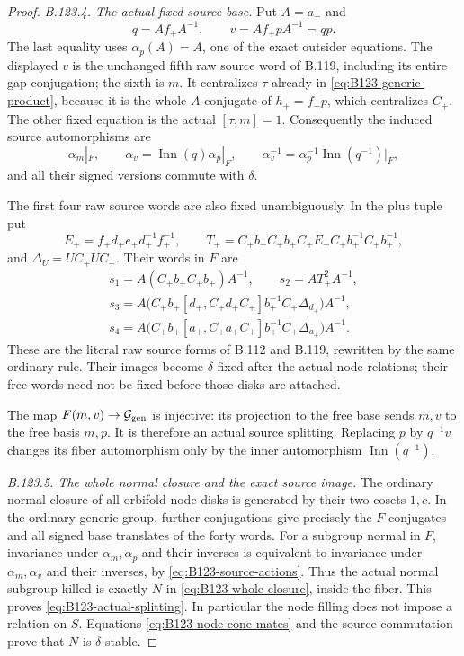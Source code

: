 \begin{proof}
\emph{B.123.4. The actual fixed source base.}
Put $A=a_+$ and
\begin{equation}\label{eq:B123-source-base}
 q=Af_+A^{-1},\qquad
 v=Af_+pA^{-1}=qp.
\end{equation}
The last equality uses $\alpha_p(A)=A$, one of the exact
outsider equations. The displayed $v$ is the unchanged fifth
raw source word of B.119, including its entire gap conjugation;
the sixth is $m$. It centralizes $\tau$ already in
\eqref{eq:B123-generic-product}, because it is the whole
$A$-conjugate of $h_+=f_+p$, which centralizes $C_+$.
The other fixed equation is the actual $[\tau,m]=1$.
Consequently the induced source automorphisms are
\begin{equation}\label{eq:B123-source-actions}
 \alpha_m|_F,\qquad
 \alpha_v=\operatorname{Inn}(q)\alpha_p|_F,\qquad
 \alpha_v^{-1}=\alpha_p^{-1}\operatorname{Inn}(q^{-1})|_F,
\end{equation}
and all their signed versions commute with $\delta$.

The first four raw source words are also fixed unambiguously.
In the plus tuple put
\[
 E_+=f_+d_+e_+d_+^{-1}f_+^{-1},\qquad
 T_+=C_+b_+C_+b_+C_+E_+C_+b_+^{-1}C_+b_+^{-1},
\]
and $\Delta_U=UC_+UC_+$. Their words in $F$ are
\begin{equation}\label{eq:B123-contact-words}
 \begin{gathered}
 s_1=A(C_+b_+C_+b_+)A^{-1},\qquad s_2=AT_+^2A^{-1},\\
 s_3=A\bigl(C_+b_+[d_+,C_+d_+C_+]b_+^{-1}C_+\Delta_{d_+}\bigr)A^{-1},\\
 s_4=A\bigl(C_+b_+[a_+,C_+a_+C_+]b_+^{-1}C_+\Delta_{a_+}\bigr)A^{-1}.
 \end{gathered}
\end{equation}
These are the literal raw source forms of B.112 and B.119,
rewritten by the same ordinary rule. Their images become
$\delta$-fixed after the actual node relations; their free
words need not be fixed before those disks are attached.

The map $F(m,v)\to\mathcal G_{\rm gen}$ is injective: its
projection to the free base sends $m,v$ to the free basis $m,p$.
It is therefore an actual source splitting. Replacing $p$ by
$q^{-1}v$ changes its fiber automorphism only by the inner
automorphism $\operatorname{Inn}(q^{-1})$.

\emph{B.123.5. The whole normal closure and the exact source image.}
The ordinary normal closure of all orbifold node disks is generated
by their two cosets $1,c$. In the ordinary generic group, further
conjugations give precisely the $F$-conjugates and all signed
base translates of the forty words. For a subgroup normal in $F$,
invariance under $\alpha_m,\alpha_p$ and their inverses is
equivalent to invariance under $\alpha_m,\alpha_v$ and their
inverses, by \eqref{eq:B123-source-actions}. Thus the actual
normal subgroup killed is exactly $N$ in
\eqref{eq:B123-whole-closure}, inside the fiber. This proves
\eqref{eq:B123-actual-splitting}. In particular the node filling
does not impose a relation on $S$. Equations
\eqref{eq:B123-node-cone-mates} and the source commutation
prove that $N$ is $\delta$-stable.


\end{proof}
